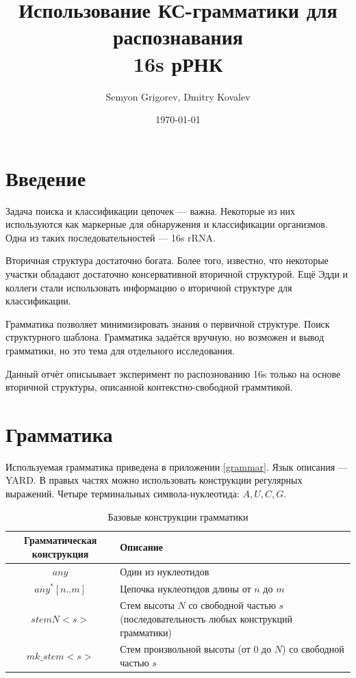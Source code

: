 \documentclass[12pt]{article}  %
\title{Использование КС-грамматики для распознавания \\ 16s рРНК}
\author{Semyon Grigorev, Dmitry Kovalev}
\date{\today}
\theoremstyle{remark}
\begin{document}

\maketitle 

\section{Введение}

Задача поиска и классификации цепочек --- важна.
Некоторые из них используются как маркерные для обнаружения и классификации организмов.
Одна из таких последовательностей --- 16s rRNA.

Вторичная структура достаточно богата.
Более того, известно, что некоторые участки обладают достаточно консервативной вторичной структурой.
Ещё Эдди и коллеги стали использовать информацию о вторичной структуре для классификации.


Грамматика позволяет минимизировать знания о первичной структуре.
Поиск структурного шаблона.
Грамматика задаётся вручную, но возможен и вывод грамматики, но это тема для отдельного исследования.

Данный отчёт описыывает эксперимент по распознованию 16s только на основе вторичной структуры, 
описанной контекстно-свободной граммтикой.

\section{Грамматика}

Используемая грамматика приведена в приложении \ref{grammar}.
Язык описания --- YARD.
В правых частях можно использовать конструкции регулярных выражений.
Четыре терминальных символа-нуклеотида: $A, U, C, G$.
\begin{table}[h]
    \centering
    \renewcommand{\arraystretch}{1.5}
    \begin{tabular}{|c|>{\centering}p{9cm}|}
        \hline
        Грамматическая конструкция & Описание 
        \tabularnewline \hline
        $ any $ & Один из нуклеотидов 
        \tabularnewline \hline
        $ any^*[n..m] $ & Цепочка нуклеотидов длины от $n$ до $m$ 
        \tabularnewline \hline
        $stemN{<}s{>}$  & Стем высоты $N$ со свободной частью $s$ (последовательность любых конструкций грамматики) 
        \tabularnewline \hline
        $mk\_stem{<}s{>}$ & Стем произвольной высоты (от $0$ до $N$) со свободной частью $s$
        \tabularnewline \hline
    \end{tabular}
    \caption{Базовые конструкции грамматики}
\end{table}
\end{document}
